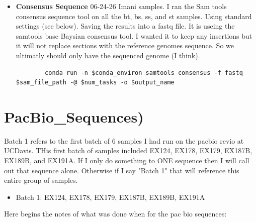 \documentclass{article}
\begin{document}
\begin{itemize}
    \item \textbf{Consensus Sequence} 06-24-26  Imani samples.   I ran the Sam tools consensus sequence tool on all the bt, bs, ss, and st samples.    Using standard settings (see below).   Saving the results into a fastq file.    It is useing the samtools base Baysian consensus tool.   I wanted it to keep any insertions but it will not replace sections with the reference genomes sequence.    So we ultimatly should only have the sequenced genome (I think).
    \begin{verbatim}
        conda run -n $conda_environ samtools consensus -f fastq $sam_file_path -@ $num_tasks -o $output_name
    \end{verbatim}
        
    

    \end{itemize}
        
        
    \newpage
    \section{PacBio_Sequences)}
    Batch 1 refers to the first batch of 6 samples I had run on the pacbio revio at UCDavis.   THis first batch of samples included EX124, EX178, EX179, EX187B, EX189B, and EX191A.   If I only do something to ONE sequence then I will call out that sequence alone.   Otherwise if I say "Batch 1" that will reference this entire group of samples.
    
    \begin{itemize}
    
   	 \item{Batch 1:}  EX124, EX178, EX179, EX187B, EX189B, EX191A
    
    \end{itemize}
    
    Here begins the notes of what was done when for the pac bio sequences:
    
\end{document}
